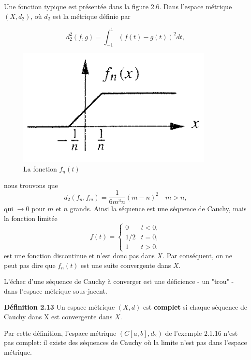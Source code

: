 \documentclass[10pt,twoside,a4paper]{book}
\begin{document}
\noindent
Une fonction typique est présentée dans la figure 2.6. Dans l'espace métrique $(X, d_2)$, où $d_2$ est la métrique définie par

\begin{equation*}
  d_2^2(f, g) = \int_{-1}^{1}(f(t) - g(t))^2 dt,
\end{equation*}

\begin{figure}[h]
  \centering
  \includegraphics[scale=0.5]{fig2.6}
  \caption{La fonction $f_n(t)$}
\end{figure}

\noindent
nous trouvons que
\begin{equation*}
  d_2(f_n, f_m) = \frac{1}{6m^3n}(m - n)^2 \quad m > n,
\end{equation*}
\noindent
qui $\longrightarrow 0$ pour $m$ et $n$ grands. Ainsi la séquence est une séquence de Cauchy, mais la fonction limitée
\begin{equation*}
  f(t) = \begin{cases} 0 & t < 0, \\
    1/2 & t = 0, \\
    1 & t > 0.
        \end{cases}
\end{equation*}
\noindent
est une fonction discontinue et n'est donc pas dans $X$. Par conséquent, on ne peut pas dire que $f_n(t)$ est une suite convergente dans $X$.

\vspace{2mm}
L'échec d'une séquence de Cauchy à converger est une déficience - un "trou" - dans l'espace métrique sous-jacent.

\vspace{4mm}
\noindent
\textbf{Définition 2.13} Un espace métrique $(X, d)$ est \textbf{complet} si chaque séquence de Cauchy dans X est convergente dans $X$.

\noindent
Par cette définition, l'espace métrique $(C[a, b], d_2)$ de l'exemple 2.1.16 n'est pas complet: il existe des séquences de Cauchy où la limite n'est pas dans l'espace métrique.
\end{document}
